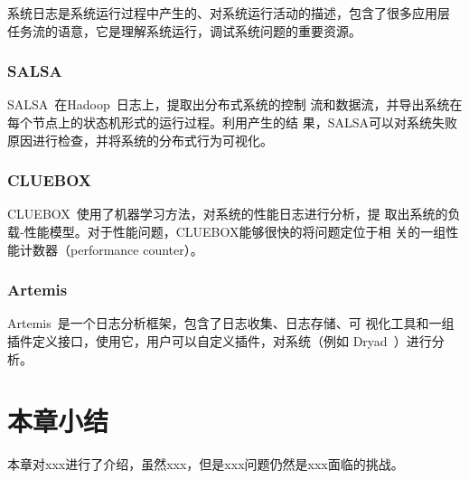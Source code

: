 
系统日志是系统运行过程中产生的、对系统运行活动的描述，包含了很多应用层
任务流的语意，它是理解系统运行，调试系统问题的重要资源。

\subsubsection*{SALSA}

SALSA~\cite{salsa}在Hadoop~\cite{hadoop}日志上，提取出分布式系统的控制
流和数据流，并导出系统在每个节点上的状态机形式的运行过程。利用产生的结
果，SALSA可以对系统失败原因进行检查，并将系统的分布式行为可视化。

\subsubsection*{CLUEBOX}

CLUEBOX~\cite{cluebox}使用了机器学习方法，对系统的性能日志进行分析，提
取出系统的负载-性能模型。对于性能问题，CLUEBOX能够很快的将问题定位于相
关的一组性能计数器（performance counter）。

\subsubsection*{Artemis}

Artemis~\cite{artemis}是一个日志分析框架，包含了日志收集、日志存储、可
视化工具和一组插件定义接口，使用它，用户可以自定义插件，对系统（例如
Dryad~\cite{dryad}）进行分析。

\section{本章小结}

本章对xxx进行了介绍，虽然xxx，但是xxx问题仍然是xxx面临的挑战。
